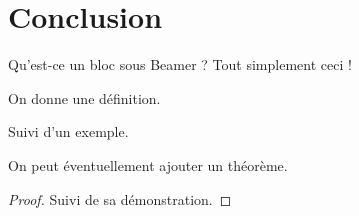 \documentclass{beamer}
\begin{document}
		\section{Conclusion}
		
		
		
		
		
		\begin{frame}
			\begin{block}{Qu'est-ce un bloc sous Beamer ?}
				Tout simplement ceci !
			\end{block}
			\begin{definition} %
				On donne une définition.
			\end{definition}

			\begin{example} %
				Suivi d'un exemple.
			\end{example}

			\begin{theorem} %
				On peut éventuellement ajouter un théorème.
			\end{theorem}

			\begin{proof} %
				Suivi de sa démonstration.
			\end{proof}
		\end{frame}
		
\end{document}
